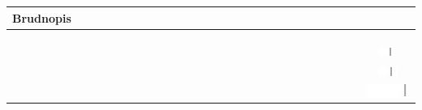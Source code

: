 \documentclass[10pt]{article}
\begin{document}
\begin{center}
\begin{tabular}{|c|c|c|c|c|c|c|c|c|c|c|c|c|c|c|c|c|c|c|c|c|c|c|c|c|c|c|c|c|c|c|}
\hline
\multicolumn{5}{|l|}{Brudnopis} &  &  &  &  &  &  &  &  &  &  &  &  &  &  &  &  &  &  &  &  &  &  &  &  &  &  \\
\hline
 &  &  &  &  &  &  &  &  &  &  &  &  &  &  &  &  &  &  &  &  &  &  &  &  &  &  &  &  &  &  \\
\hline
 &  &  &  &  &  &  &  &  &  &  &  &  &  &  &  &  &  &  &  &  &  &  &  &  &  &  &  &  &  &  \\
\hline
 &  &  &  &  &  &  &  &  &  &  &  &  &  &  &  &  &  &  &  &  &  &  &  &  &  &  &  &  &  &  \\
\hline
 &  &  &  &  &  &  &  &  &  &  &  &  &  &  &  &  &  &  &  &  &  &  &  &  &  &  &  &  &  & \includegraphics[max width=\textwidth]{2024_11_21_51cb67544fb9b029f01cg-21}
 \\
\hline
 &  &  &  &  &  &  &  &  &  &  &  &  &  &  &  &  &  &  &  &  &  &  &  &  &  &  &  &  &  & \includegraphics[max width=\textwidth]{2024_11_21_51cb67544fb9b029f01cg-21(3)}
 \\
\hline
 &  &  &  &  &  &  &  &  &  &  &  &  &  &  &  &  &  &  &  &  &  &  &  &  &  &  &  &  &  & \includegraphics[max width=\textwidth]{2024_11_21_51cb67544fb9b029f01cg-21(2)}

\end{tabular}
\end{center}
\end{document}
